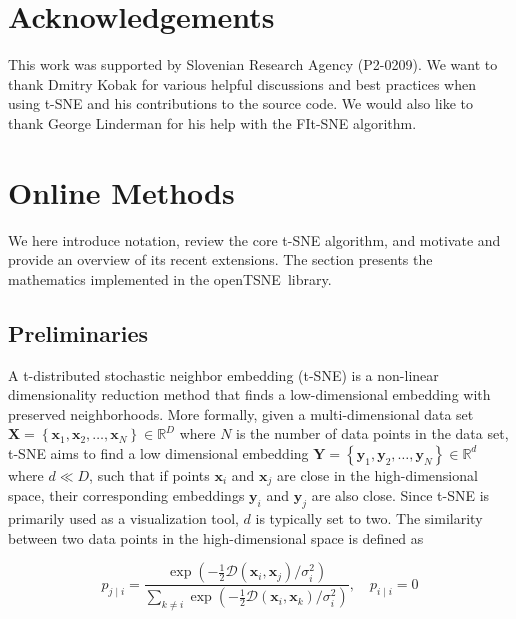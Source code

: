 \documentclass[letter]{article}
\newcommand{\opentsne}{\textsf{openTSNE}}
\begin{document}
\section*{Acknowledgements}
This work was supported by Slovenian Research Agency (P2-0209).
We want to thank Dmitry Kobak for various helpful discussions and best practices
when using t-SNE and his contributions to the source code. We would also
like to thank George Linderman for his help with the FIt-SNE algorithm.


\eject
\fontsize{8}{10}\selectfont
\section*{Online Methods}

We here introduce notation, review the core t-SNE algorithm, and motivate and provide an overview of its recent extensions. The section presents the mathematics implemented in the \opentsne\ library.

\subsection*{Preliminaries}

A t-distributed stochastic neighbor embedding (t-SNE) is a non-linear dimensionality reduction method that finds a low-dimensional embedding with preserved neighborhoods. More formally, given a multi-dimensional data set $\mathbf{X} = \left \{ \mathbf{x}_1, \mathbf{x}_2, \dots, \mathbf{x}_N \right \} \in \mathbb{R}^D$ where $N$ is the number of data points in the data set, t-SNE aims to find a low dimensional embedding $\mathbf{Y} = \left \{ \mathbf{y}_1, \mathbf{y}_2, \dots, \mathbf{y}_N \right\} \in \mathbb{R}^d$ where $d \ll D$, such that if points $\mathbf{x}_i$ and $\mathbf{x}_j$ are close in the high-dimensional space, their corresponding embeddings $\mathbf{y}_i$ and $\mathbf{y}_j$ are also close. Since t-SNE is primarily used as a visualization tool, $d$ is typically set to two. The similarity between two data points in the high-dimensional space is defined as

\begin{equation}
p_{j \mid i} = \frac{\exp \left ( -\frac{1}{2} \mathcal{D}(\mathbf{x}_i, \mathbf{x}_j ) / \sigma_i^2 \right )}
{\sum_{k \neq i } \exp \left ( -\frac{1}{2} \mathcal{D}(\mathbf{x}_i, \mathbf{x}_k ) / \sigma_i^2 \right )}, \quad p_{i \mid i} = 0
\label{eq:gaussian_kernel}
\end{equation}
\end{document}
